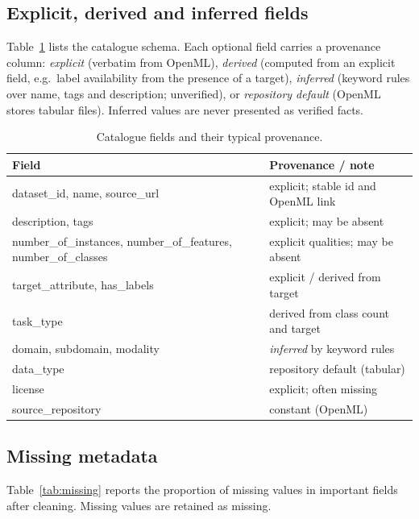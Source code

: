 \documentclass[conference]{IEEEtran}
\begin{document}
\subsection{Explicit, derived and inferred fields}
Table~\ref{tab:fields} lists the catalogue schema. Each optional field carries a provenance column: \emph{explicit} (verbatim from OpenML), \emph{derived} (computed from an explicit field, e.g.\ label availability from the presence of a target), \emph{inferred} (keyword rules over name, tags and description; unverified), or \emph{repository default} (OpenML stores tabular files). Inferred values are never presented as verified facts.

\begin{table}[t]
\centering
\caption{Catalogue fields and their typical provenance.}
\label{tab:fields}
\scriptsize
\begin{tabular}{p{3.3cm}p{4.4cm}}
\toprule
Field & Provenance / note \\
\midrule
dataset\_id, name, source\_url & explicit; stable id and OpenML link \\
description, tags & explicit; may be absent \\
number\_of\_instances, number\_of\_features, number\_of\_classes & explicit qualities; may be absent \\
target\_attribute, has\_labels & explicit / derived from target \\
task\_type & derived from class count and target \\
domain, subdomain, modality & \emph{inferred} by keyword rules \\
data\_type & repository default (tabular) \\
license & explicit; often missing \\
source\_repository & constant (OpenML) \\
\bottomrule
\end{tabular}
\end{table}

\subsection{Missing metadata}
Table~\ref{tab:missing} reports the proportion of missing values in important fields after cleaning. Missing values are retained as missing.
\end{document}
